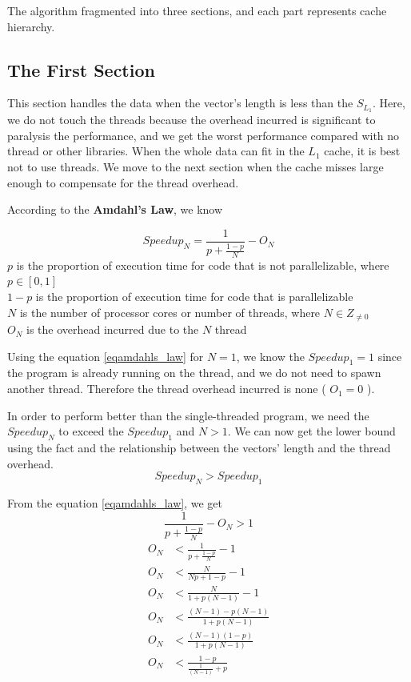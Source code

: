 The algorithm fragmented into three sections, and each part represents cache hierarchy.

\subsection{The First Section}

This section handles the data when the vector's length is less than the $S_{L_1}$. 
Here, we do not touch the threads because the overhead incurred is significant 
to paralysis the performance, and we get the worst performance compared with no 
thread or other libraries. When the whole data can fit in the $L_1$ cache, 
it is best not to use threads. We move to the next section when the cache 
misses large enough to compensate for the thread overhead.

According to the \textbf{Amdahl's Law}, we know

\begin{equation}
    Speedup_N = \frac{1}{ p + \frac{1 - p}{N} } - O_N
    \label{eqamdahls_law}
\end{equation}
$p$ is the proportion of execution time for code that is not parallelizable, where $p \in [0,1]$ \\
$1 - p$ is the proportion of execution time for code that is parallelizable \\
$N$ is the number of processor cores or number of threads, where $N \in Z_{\ne 0}$ \\
$O_N$ is the overhead incurred due to the $N$ thread

Using the equation \ref{eqamdahls_law}  for $N = 1$, we know the $Speedup_1 = 1$ since 
the program is already running on the thread, and we do not need to spawn another thread. 
Therefore the thread overhead incurred is none ( $O_1 = 0$ ).

In order to perform better than the single-threaded program, 
we need the $Speedup_N$ to exceed the $Speedup_1$ and $N > 1$. 
We can now get the lower bound using the fact and the 
relationship between the vectors' length and the thread overhead.
\[Speedup_N > Speedup_1\]

From the equation \ref{eqamdahls_law}, we get
\[\frac{1}{ p + \frac{1 - p}{N} } - O_N > 1\]
\begin{align*}
O_N &< \frac{1}{ p + \frac{1 - p}{N} } - 1\\
O_N &< \frac{N}{ Np + 1 - p } - 1\\
O_N &< \frac{N}{ 1 + p(N - 1) } - 1\\
O_N &< \frac{(N - 1) - p(N - 1)}{ 1 + p(N - 1) }\\
O_N &< \frac{(N - 1)(1 - p)}{ 1 + p(N - 1) }\\
O_N &< \frac{1 - p}{ \frac{1}{(N - 1)} + p }
\end{align*}

